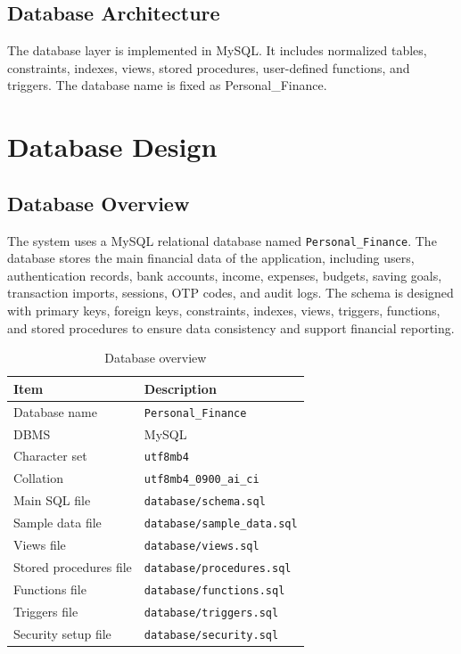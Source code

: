 ﻿\documentclass{article}
\newcommand{\dbname}{Personal\_Finance}
\begin{document}
\subsection{Database Architecture}
The database layer is implemented in MySQL. It includes normalized tables, constraints, indexes, views, stored procedures, user-defined functions, and triggers. The database name is fixed as \dbname.

\section{Database Design}

\subsection{Database Overview}

The system uses a MySQL relational database named \texttt{Personal\_Finance}.
The database stores the main financial data of the application, including users,
authentication records, bank accounts, income, expenses, budgets, saving goals,
transaction imports, sessions, OTP codes, and audit logs. The schema is designed
with primary keys, foreign keys, constraints, indexes, views, triggers, functions,
and stored procedures to ensure data consistency and support financial reporting.

\begin{table}[H]
\centering
\caption{Database overview}
\label{tab:database-overview}
\small
\renewcommand{\arraystretch}{1.15}
\begin{tabular}{ll}
\toprule
\textbf{Item} & \textbf{Description} \\
\midrule
Database name       & \texttt{Personal\_Finance} \\
DBMS                & MySQL \\
Character set       & \texttt{utf8mb4} \\
Collation           & \texttt{utf8mb4\_0900\_ai\_ci} \\
Main SQL file       & \texttt{database/schema.sql} \\
Sample data file    & \texttt{database/sample\_data.sql} \\
Views file          & \texttt{database/views.sql} \\
Stored procedures file & \texttt{database/procedures.sql} \\
Functions file      & \texttt{database/functions.sql} \\
Triggers file       & \texttt{database/triggers.sql} \\
Security setup file & \texttt{database/security.sql} \\
\bottomrule
\end{tabular}
\end{table}
\end{document}
